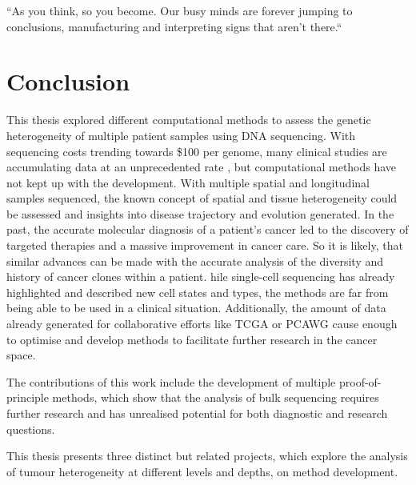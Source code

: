 
\begin{savequote}[85mm]
``As you think, so you become. Our busy minds are forever jumping to conclusions, manufacturing and interpreting signs that aren’t there.``
\end{savequote}


\chapter{Conclusion}
\label{ch:conclusion}
\fancyhead[RE,LO]{\rightmark}

This thesis explored different computational methods to assess the genetic heterogeneity of multiple patient samples using DNA sequencing. With sequencing costs  trending towards \$100 per genome, many clinical studies are  accumulating data at an unprecedented rate \cite{Stephens2015}, but computational methods have not kept up with the development. With multiple spatial and longitudinal samples sequenced, the known concept of spatial and tissue heterogeneity could be assessed and insights into disease trajectory and evolution generated. In the past, the accurate molecular diagnosis of a patient's cancer led to the discovery of targeted therapies and a massive improvement in cancer care. So it is likely, that similar advances can be made with the accurate analysis of the diversity and history of cancer clones within a patient. hile single-cell sequencing has already highlighted and described new cell states and types, the methods are far from being able to be used in a clinical situation. Additionally, the amount of data already generated for collaborative efforts like TCGA \cite{IPCAWGC2020} or PCAWG  cause enough to optimise and develop methods to facilitate further research in the cancer space.

The contributions of this work include the development of multiple proof-of-principle methods, which show that the analysis of bulk sequencing requires further research and has unrealised potential for both diagnostic and research questions.

This thesis presents three distinct but related projects, which explore the analysis of tumour heterogeneity at different levels and depths,  on method development.


